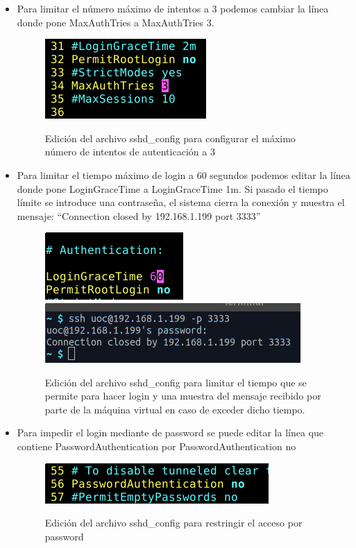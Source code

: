 \documentclass[10pt,a4paper]{article}
\begin{document}
\begin{enumerate}[label=\textbf{\alph*)}]
\begin{itemize}
\item Para limitar el número máximo de intentos a 3 podemos cambiar la línea donde pone MaxAuthTries a MaxAuthTries 3.

\begin{figure}[h!]
  \centering
  \includegraphics[scale=0.6]{ssh3.png}\\
  \caption{Edición del archivo sshd\_config para configurar el máximo número de intentos de autenticación a 3}
  \label{fig:tries}
\end{figure}

\item Para limitar el tiempo máximo de login a 60 segundos podemos editar la línea donde pone LoginGraceTime a LoginGraceTime 1m. Si pasado el tiempo límite se introduce una contraseña, el sistema cierra la conexión y muestra el mensaje: ``Connection closed by 192.168.1.199 port 3333''

\begin{figure}[h!]
  \centering
  \includegraphics[scale=0.6]{ssh4.png}
    \includegraphics[scale=0.6]{ssh5.png}\\
  \caption{Edición del archivo sshd\_config para limitar el tiempo que se permite para hacer login y una muestra del mensaje recibido por parte de la máquina virtual en caso de exceder dicho tiempo.}
  \label{fig:loggintime}
\end{figure}

\item Para impedir el login mediante de password se puede editar la línea que contiene PasswordAuthentication por PasswordAuthentication no
\begin{figure}[h!]
  \centering
  \includegraphics[scale=0.6]{ssh6.png}\\
  \caption{Edición del archivo sshd\_config para restringir el acceso por password}
  \label{fig:passauth}
\end{figure}


\end{itemize}
\end{enumerate}
\end{document}
